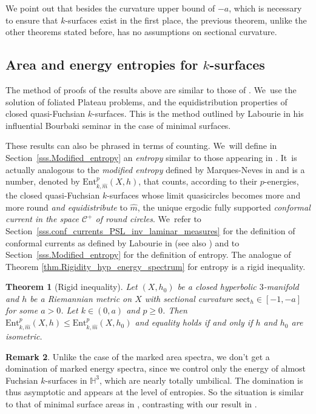 \documentclass[11pt]{article}
\newcommand{\ksurfaces}{$k$\nobreakdash-surfaces\xspace}
\theoremstyle{plain}
\newtheorem{theorem}{Theorem}[section]
\theoremstyle{definition}
\newtheorem{remark}[theorem]{Remark}
\newcommand\Hyp{\mathbb{H}^3}
\newcommand{\cC}{{\mathcal C}}
\newcommand{\sect}{\mathrm{sect}}
\newcommand{\Ent}{\mathrm{Ent}}
\begin{document}
We point out that besides the curvature upper bound of $-a$, which is necessary to ensure that \ksurfaces exist in the first place, the previous theorem, unlike the other theorems stated before, has no assumptions on sectional curvature.

\subsection{Area and energy entropies for \ksurfaces} The method of proofs of the results above are similar to those of \cite{ALS}. We~use the solution of foliated Plateau problems, and the equidistribution properties of closed quasi-Fuchsian \ksurfaces. This is the method outlined by Labourie in his influential Bourbaki seminar \cite{LabourieBourbaki} in the case of minimal surfaces.

These results can also be phrased in terms of counting. We~will define in Section~\ref{sss.Modified_entropy} an \emph{entropy} similar to those appearing in \cite{ALS,CMN}. It~is actually analogous to the \emph{modified entropy} defined by Marques-Neves in \cite{MN_currents} and is a number, denoted by $\Ent^p_{k,\hat m}(X,h)$, that counts, according to their $p$-energies, the closed quasi-Fuchsian \ksurfaces whose limit quasicircles becomes more and more round \emph{and equidistribute} to $\hat m$, the unique ergodic fully supported \emph{conformal current in the space $\cC^+$ of round circles}. We~refer to Section~\ref{sss.conf_currents_PSL_inv_laminar_measures} for the definition of conformal currents as defined by Labourie in \cite{LabourieBourbaki} (see also \cite{ALS,MN_currents}) and to Section~\ref{sss.Modified_entropy} for the definition of entropy. The analogue of Theorem \ref{thm.Rigidity_hyp_energy_spectrum} for entropy is a rigid inequality.

\begin{theorem}[Rigid inequality]\label{th.rigidity_entropy}
Let $(X,h_0)$ be a closed hyperbolic $3$\nobreakdash-manifold and $h$ be a Riemannian metric on $X$ with sectional curvature $\sect_h\in[-1,-a]$ for some $a>0$. Let $k\in (0,a)$ and $p\geq 0$. Then $\Ent^p_{k,\hat m}(X,h)\leq\Ent^p_{k,\hat m}(X,h_0)$ and equality holds if and only if $h$ and $h_0$ are isometric.
\end{theorem}

\begin{remark}
Unlike the case of the marked area spectra, we don't get a domination of marked energy spectra, since we control only the energy of almost Fuchsian $k$\nobreakdash-surfaces in $\Hyp$, which are nearly totally umbilical. The domination is thus asymptotic and appears at the level of entropies. So the situation is similar to that of minimal surface areas in \cite{CMN}, contrasting with our result in \cite{ALS}.
\end{remark}
\end{document}
